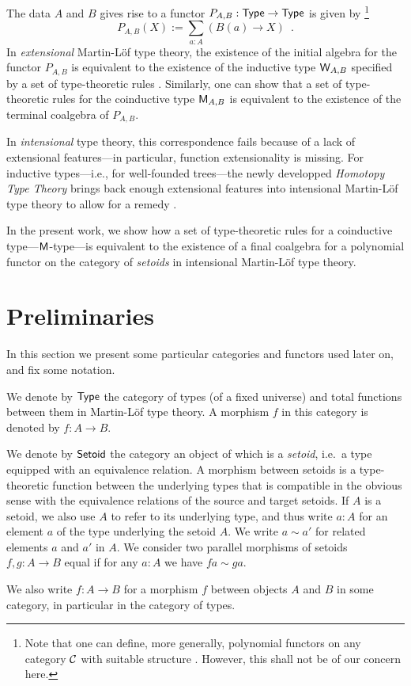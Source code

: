 \documentclass[envcountsame]{llncs}
\begin{document}
The data $A$ and $B$ gives rise to a functor $P_{A,B} : \mathsf{Type} \to \mathsf{Type}$ is given by 
\footnote{Note that one can define, more generally, polynomial functors on any category ${\mathcal{C}}$ with suitable structure
\parencite{DBLP:journals/apal/MoerdijkP00}.
However, this shall not be of our concern here.}
 \[ P_{A,B}(X) := \sum_{a:A}\left(B(a) \to X\right) \enspace . \]
In \emph{extensional} Martin-L\"of type theory, the existence of the initial algebra for the functor $P_{A,B}$ 
is equivalent to the existence of the inductive type $\mathsf{W}_{A,B}$ specified by a set of type-theoretic rules
\parencite{DBLP:journals/tcs/Dybjer97}.
Similarly, one can show that a set of type-theoretic rules for the coinductive type $\mathsf{M}_{A,B}$ is equivalent to the 
existence of the terminal coalgebra of $P_{A,B}$.

In \emph{intensional} type theory, this correspondence fails because of a lack of extensional features---in particular, function extensionality is missing.
For inductive types---i.e., for well-founded trees---the newly developped \emph{Homotopy Type Theory} brings back enough
extensional features into intensional Martin-Löf type theory to allow for a remedy \parencite{DBLP:conf/lics/AwodeyGS12}.

In the present work, we show how a set of type-theoretic rules for a coinductive type---$\mathsf{M}$-type---is equivalent to the 
existence of a final coalgebra for a polynomial functor on the category of \emph{setoids} in intensional Martin-Löf type theory.



\section{Preliminaries}\label{sec:preliminaries}

In this section we present some particular categories and functors used later on, and fix some notation.


\begin{definition}\label{def:set_setoid}
 We denote by $\mathsf{Type}$ the category of types (of a fixed universe) and total functions between them in Martin-L\"of type theory. 
 A morphism $f$ in this category is denoted by $f : A \to B$.
 
 We denote by $\mathsf{Setoid}$ the category an object of which is a \emph{setoid}, i.e.\ a type equipped with an equivalence relation.
 A morphism between setoids is a type-theoretic function between the underlying types that is compatible in the obvious sense with the equivalence relations of the source and target setoids.
 If $A$ is a setoid, we also use $A$ to refer to its underlying type, and thus write $a:A$ for an element $a$ of the type underlying the setoid $A$. 
 We write $a\sim a'$ for related elements $a$ and $a'$ in $A$.
 We consider two parallel morphisms of setoids $f,g:A\to B$ equal if for any $a:A$ we have $fa \sim ga$.
 
 We also write $f:A\to B$ for a morphism $f$ between objects $A$ and $B$ in some category, in particular in the category of types.
 \end{definition}
\end{document}
